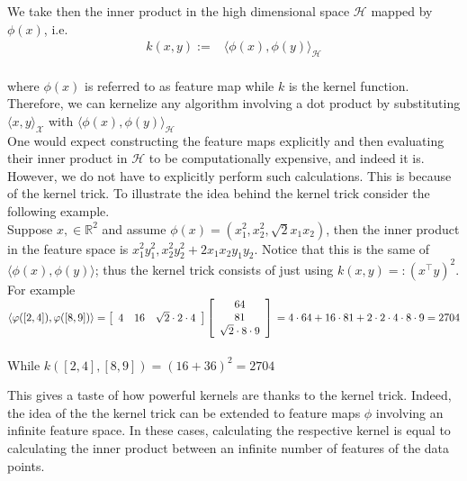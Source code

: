 We take then the inner product in the high dimensional space $\mathcal{H}$ mapped by $\phi(x)$, i.e.\
\\
\begin{align*}
k(x,y):=&\langle \phi(x), \phi(y) \rangle_{\mathcal{H}}
\end{align*}
\\
where $\phi(x)$ is referred to as feature map while $k$ is the kernel function.
\\
Therefore, we can kernelize any algorithm involving a dot product by substituting $\langle x, y \rangle_{\mathcal{X}}$ with $\langle \phi(x), \phi(y) \rangle_{\mathcal{H}}$
\\
One would expect constructing the feature maps explicitly and then evaluating their inner product in $\mathcal{H}$ to be computationally expensive, and indeed it is. However, we do not have to explicitly perform such calculations. This is because of the kernel trick.
To illustrate the idea behind the kernel trick consider the following example. 
\\
Suppose $x,  \in \mathbb{R}^2$ and assume $\phi(x)=(x_{1}^{2},x_{2}^{2},\sqrt{2}x_{1}x_{2})$, then the inner product in the feature space is $x_{1}^{2}y_{1}^{2},x_{2}^{2}y_{2}^{2}+2x_{1}x_{2}y_{1}y_{2}$.
Notice that this is the same of $\langle \phi(x), \phi(y) \rangle$; thus the kernel trick consists of just using $k(x,y)=:(x^\intercal y)^2$.
For example
\\
$\langle \phi([2,4]),\phi([8,9]) \rangle=  \left[ {\begin{array}{cccc}
    4 & 16 &     \sqrt{2}\cdot 2 \cdot 4\\
  \end{array} } \right]
  \left[ {\begin{array}{cccc}
    64\\
    81\\
    \sqrt{2}\cdot8 \cdot 9
    \\
  \end{array} } \right]\\=4\cdot 64 +16\cdot 81 +2 \cdot 2 \cdot 4 \cdot 8 \cdot 9=2704
$
\\
\\
While $k([2,4], [8,9])=(16+36)^2=2704$

This gives a taste of how powerful kernels are thanks to the kernel trick.
Indeed, the idea of the the kernel trick can be extended to feature maps
$\phi$ involving an infinite feature space. In these cases, calculating the
respective kernel is equal to calculating the inner product between an infinite
number of features of the data points.



